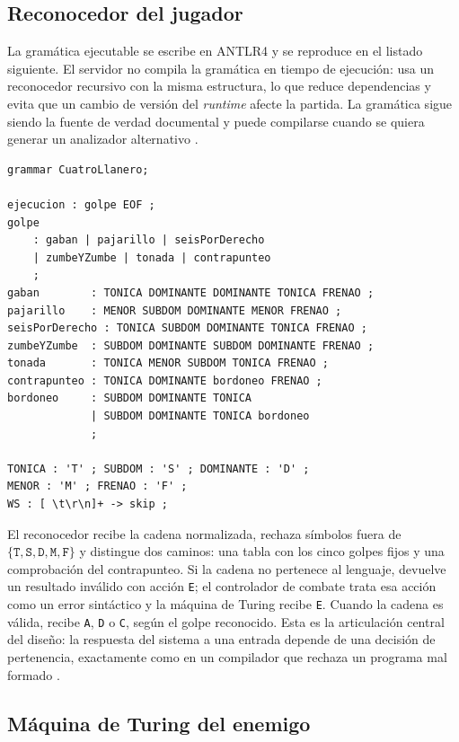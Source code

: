 \documentclass[9pt]{ieeeconf}
\newcommand{\tk}[1]{\texttt{#1}}
\begin{document}
\subsection{Reconocedor del jugador}
\label{sec:reconocedor}

La gramática ejecutable se escribe en ANTLR4 y se reproduce en el listado siguiente. El servidor no compila la gramática en tiempo de ejecución: usa un reconocedor recursivo con la misma estructura, lo que reduce dependencias y evita que un cambio de versión del \emph{runtime} afecte la partida. La gramática sigue siendo la fuente de verdad documental y puede compilarse cuando se quiera generar un analizador alternativo \cite{parr2013,antlr2026}.

\begin{lstlisting}
grammar CuatroLlanero;

ejecucion : golpe EOF ;
golpe
    : gaban | pajarillo | seisPorDerecho
    | zumbeYZumbe | tonada | contrapunteo
    ;
gaban        : TONICA DOMINANTE DOMINANTE TONICA FRENAO ;
pajarillo    : MENOR SUBDOM DOMINANTE MENOR FRENAO ;
seisPorDerecho : TONICA SUBDOM DOMINANTE TONICA FRENAO ;
zumbeYZumbe  : SUBDOM DOMINANTE SUBDOM DOMINANTE FRENAO ;
tonada       : TONICA MENOR SUBDOM TONICA FRENAO ;
contrapunteo : TONICA DOMINANTE bordoneo FRENAO ;
bordoneo     : SUBDOM DOMINANTE TONICA
             | SUBDOM DOMINANTE TONICA bordoneo
             ;

TONICA : 'T' ; SUBDOM : 'S' ; DOMINANTE : 'D' ;
MENOR : 'M' ; FRENAO : 'F' ;
WS : [ \t\r\n]+ -> skip ;
\end{lstlisting}

El reconocedor recibe la cadena normalizada, rechaza símbolos fuera de $\{\tk{T},\tk{S},\tk{D},\tk{M},\tk{F}\}$ y distingue dos caminos: una tabla con los cinco golpes fijos y una comprobación del contrapunteo. Si la cadena no pertenece al lenguaje, devuelve un resultado inválido con acción \texttt{E}; el controlador de combate trata esa acción como un error sintáctico y la máquina de Turing recibe \texttt{E}. Cuando la cadena es válida, recibe \texttt{A}, \texttt{D} o \texttt{C}, según el golpe reconocido. Esta es la articulación central del diseño: la respuesta del sistema a una entrada depende de una decisión de pertenencia, exactamente como en un compilador que rechaza un programa mal formado \cite{aho2006,parr2013}.

\subsection{Máquina de Turing del enemigo}
\label{sec:maquina}
\end{document}
